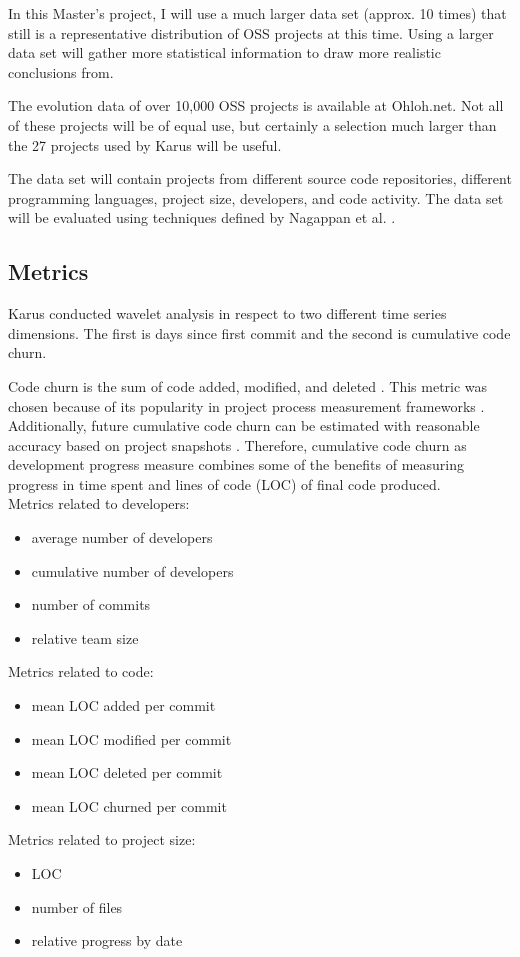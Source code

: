In this Master's project, I will use a much larger data set (approx. 10
times) that still is a representative distribution of OSS projects at this time.
Using a larger data set will gather more statistical information to draw more
realistic conclusions from.

The evolution data of over 10,000 OSS projects is available at Ohloh.net. Not
all of these projects will be of equal use, but certainly a selection much
larger than the 27 projects used by Karus will be useful.

The data set will contain projects from different source code repositories,
different programming languages, project size, developers, and code activity.
The data set will be evaluated using techniques defined by Nagappan et al.
\cite{nagappan}.

\subsection{Metrics}
Karus conducted wavelet analysis in respect to two different time series
dimensions. The first is days since first commit and the second is cumulative
code churn.

Code churn is the sum of code added, modified, and deleted \cite{elbaum}. This
metric was chosen because of its popularity in project process measurement
frameworks \cite{karus2013}. Additionally, future cumulative code churn can be
estimated with reasonable accuracy based on project snapshots \cite{dumas}.
Therefore, cumulative code churn as development progress measure combines some
of the benefits of measuring progress in time spent and lines of code (LOC) of
final code produced.
\\

\noindent
Metrics related to developers:
\begin{itemize}
	\item average number of developers
	\item cumulative number of developers
	\item number of commits
	\item relative team size
\end{itemize}
Metrics related to code:
\begin{itemize}
	\item mean LOC added per commit
	\item mean LOC modified per commit
	\item mean LOC deleted per commit
	\item mean LOC churned per commit
\end{itemize}
Metrics related to project size:
\begin{itemize}
	\item LOC
	\item number of files
	\item relative progress by date
\end{itemize}

